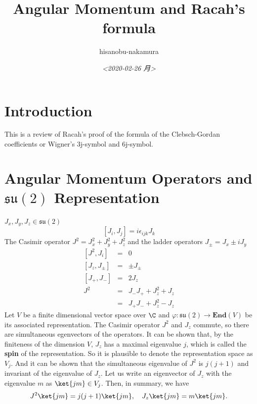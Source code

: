 \documentclass{article}
\author{hisanobu-nakamura}
\date{\textit{<2020-02-26 月>}}
\title{Angular Momentum and Racah's formula}
\begin{document}
\maketitle




\section{Introduction}
\label{sec-1}
This is a review of Racah's proof of the formula of the Clebsch-Gordan coefficients or Wigner's 3j-symbol and 6j-symbol.
\section{Angular Momentum Operators and $\mathfrak{su}(2)$ Representation}
\label{sec-2}
$J_x,J_y,J_z \in \mathfrak{su}(2)$
\begin{equation}
\label{}
[J_i,J_j] = i\epsilon_{ijk}J_k
\end{equation}
The Casimir operator $J ^2 = J_x^2 + J_y^2 + J_z^2$ and the ladder operators $J_{\pm}=J_x\pm iJ_y$
\begin{eqnarray}
\left[J^2,J_i\right] &=& 0\\
\left[J_z,J_{\pm}\right] & = & \pm J_{\pm} \\
\left[ J_+,J_- \right] &=& 2J_z\\
J^2 & = & J_-J_+ +J_z^2 + J_z \\
    &=& J_+J_- +J_z^2 - J_z 
\end{eqnarray}
Let $V$ be a finite dimensional vector space over $\C$ and $\varphi:\mathfrak{su}(2) \rightarrow \mathbf{End}(V)$ be its associated representation.
The Casimir operator $J ^2$ and $J_{z}$ commute, so there are simultaneous egenvectors of the operators. 
It can be shown that, by the finiteness of the dimension $V$, $J_{z}$ has a maximal eigenvalue $j$, which is called the \textbf{spin} of the representation.
So it is plausible to denote the representation space as $V_{j}$. And it can be shown that the simultaneous eigenvalue of $J ^2$ is $j(j+1)$ and invariant of the eigenvalue of $J_{z}$.
 Let us write an eigenvector of $J_{z}$ with the eigenvalue $m$ as $\ket{jm} \in V_{j}$. Then, in summary, we have
\begin{equation}
\label{}
J^2\ket{jm} = j(j+1)\ket{jm}, \quad J_z\ket{jm} = m\ket{jm}.
\end{equation}
\end{document}
